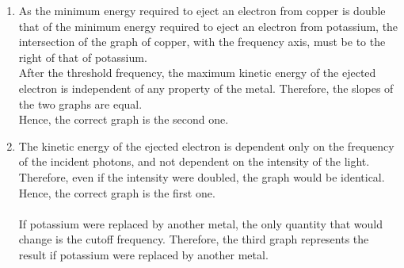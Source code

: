 \documentclass[fleqn, a4paper, 11pt, oneside]{amsart}
\theoremstyle{definition}
\theoremstyle{theorem}
\begin{document}
\begin{question}
\begin{enumerate}
\begin{enumerate}
\begin{figure}[H]
					\end{figure}
			\end{enumerate}
	\end{enumerate}
\end{question}

\begin{solution}
	\begin{enumerate}
		\item
			As the minimum energy required to eject an electron from copper is double that of the minimum energy required to eject an electron from potassium, the intersection of the graph of copper, with the frequency axis, must be to the right of that of potassium.\\
			After the threshold frequency, the maximum kinetic energy of the ejected electron is independent of any property of the metal.
			Therefore, the slopes of the two graphs are equal.\\
			Hence, the correct graph is the second one.
		\item
			The kinetic energy of the ejected electron is dependent only on the frequency of the incident photons, and not dependent on the intensity of the light.
			Therefore, even if the intensity were doubled, the graph would be identical.
			Hence, the correct graph is the first one.\\
			~\\
			If potassium were replaced by another metal, the only quantity that would change is the cutoff frequency.
			Therefore, the third graph represents the result if potassium were replaced by another metal.
	\end{enumerate}
\end{solution}
\end{document}
